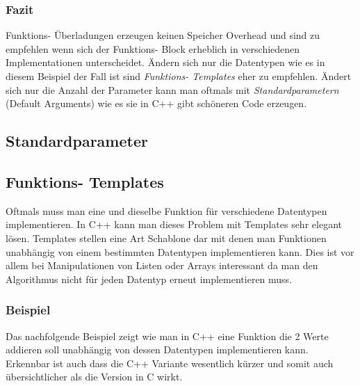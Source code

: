 \documentclass[MES,Master,ngerman]{twbook}%
\begin{document}
\subsubsection{Fazit}
Funktions- Überladungen erzeugen keinen Speicher Overhead und sind zu empfehlen wenn sich der Funktions- Block erheblich in verschiedenen Implementationen unterscheidet. Ändern sich nur die Datentypen wie es in diesem Beispiel der Fall ist sind \textit{Funktions- Templates} eher zu empfehlen. Ändert sich nur die Anzahl der Parameter kann man oftmals mit \textit{Standardparametern} (Default Arguments) wie es sie in C++ gibt schöneren Code erzeugen.

\newpage
\subsection{Standardparameter}

\newpage
\subsection{Funktions- Templates}
Oftmals muss man eine und dieselbe Funktion für verschiedene Datentypen implementieren. In C++ kann man dieses Problem mit Templates sehr elegant lösen. Templates stellen eine Art Schablone dar mit denen man Funktionen unabhängig von einem bestimmten Datentypen implementieren kann. Dies ist vor allem bei Manipulationen von Listen oder Arrays interessant da man den Algorithmus nicht für jeden Datentyp erneut implementieren muss. 

\subsubsection{Beispiel}
Das nachfolgende Beispiel zeigt wie man in C++ eine Funktion die 2 Werte addieren soll unabhängig von dessen Datentypen implementieren kann. Erkennbar ist auch dass die C++ Variante wesentlich kürzer und somit auch übersichtlicher als die Version in C wirkt.
\begin{figure}[!htb]
	\begin{subfigure}[b]{0.5\textwidth}
		
		\label{fig:3}
	\end{subfigure}
	\begin{subfigure}[b]{0.5\textwidth}
		
		\label{fig:4}
	\end{subfigure}
\end{figure}
\end{document}
